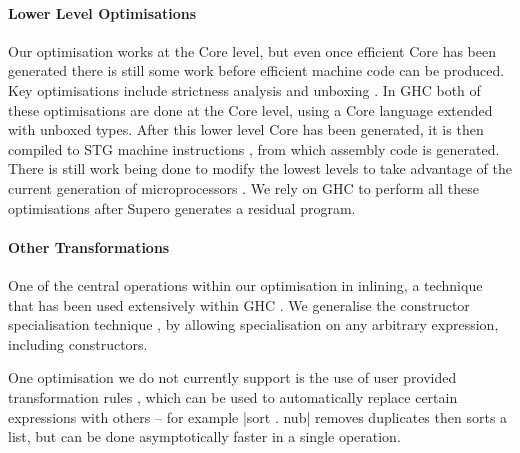 \paragraph{Lower Level Optimisations} Our optimisation works at the Core level, but even once efficient Core has been generated there is still some work before efficient machine code can be produced. Key optimisations include strictness analysis and unboxing \cite{spj:unboxing}. In GHC both of these optimisations are done at the Core level, using a Core language extended with unboxed types. After this lower level Core has been generated, it is then compiled to STG machine instructions \cite{spj:stg}, from which assembly code is generated. There is still work being done to modify the lowest levels to take advantage of the current generation of microprocessors \cite{marlow:pointer_tagging}. We rely on GHC to perform all these optimisations after Supero generates a residual program.

\paragraph{Other Transformations} One of the central operations within our optimisation in inlining, a technique that has been used extensively within GHC \cite{spj:inlining}. We generalise the constructor specialisation technique \cite{spj:specconstr}, by allowing specialisation on any arbitrary expression, including constructors.

One optimisation we do not currently support is the use of user provided transformation rules \cite{spj:rules}, which can be used to automatically replace certain expressions with others -- for example |sort . nub| removes duplicates then sorts a list, but can be done asymptotically faster in a single operation.

